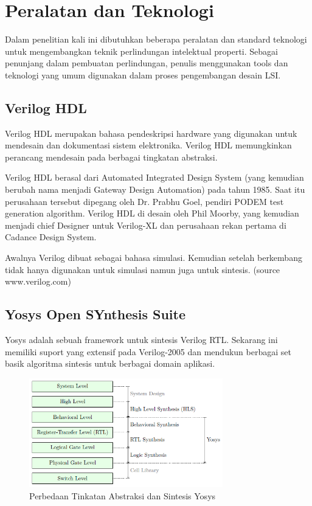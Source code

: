 \section{Peralatan dan Teknologi}
Dalam penelitian kali ini dibutuhkan beberapa peralatan dan standard teknologi untuk mengembangkan teknik perlindungan intelektual properti. Sebagai penunjang dalam pembuatan perlindungan, penulis menggunakan tools dan teknologi yang umum digunakan dalam proses pengembangan desain LSI.

\subsection{Verilog HDL}
Verilog HDL merupakan bahasa pendeskripsi hardware yang digunakan untuk mendesain dan dokumentasi sistem elektronika. Verilog HDL memungkinkan perancang mendesain pada berbagai tingkatan abstraksi.

Verilog HDL berasal dari Automated Integrated Design System (yang kemudian berubah nama menjadi Gateway Design Automation) pada tahun 1985. Saat itu perusahaan tersebut dipegang oleh Dr. Prabhu Goel, pendiri PODEM test generation algorithm. Verilog HDL di desain oleh Phil Moorby, yang kemudian menjadi chief Designer untuk Verilog-XL dan perusahaan rekan pertama di Cadance Design System. 

Awalnya Verilog dibuat sebagai bahasa simulasi. Kemudian setelah berkembang tidak hanya digunakan untuk simulasi namun juga untuk sintesis. (source www.verilog.com)

\subsection{Yosys Open SYnthesis Suite}
Yosys adalah sebuah framework untuk sintesis Verilog RTL. Sekarang ini memiliki suport yang extensif pada Verilog-2005 dan mendukun berbagai set basik algoritma sintesis untuk berbagai domain aplikasi.

\begin{figure}
	\centering
	\includegraphics[width=0.75\textwidth]
	{pics/yosys.png}
	\caption{Perbedaan Tinkatan Abstraksi dan Sintesis Yosys}
	\label{yosys}
\end{figure}

